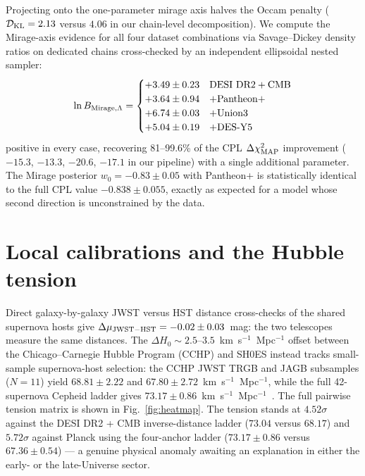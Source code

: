 \documentclass[aps,prd,twocolumn,superscriptaddress,nofootinbib]{revtex4-2}
\begin{document}
Projecting onto the one-parameter mirage axis halves the Occam penalty ($\mathcal{D}_{\rm KL} = 2.13$ versus $4.06$ in our chain-level decomposition). We compute the Mirage-axis evidence for all four dataset combinations via Savage--Dickey density ratios on dedicated chains cross-checked by an independent ellipsoidal nested sampler:
\begin{equation}
\ln B_{\rm Mirage,\Lambda} = \begin{cases}
+3.49 \pm 0.23 & {\rm DESI~DR2 + CMB} \\
+3.64 \pm 0.94 & + {\rm Pantheon+} \\
+6.74 \pm 0.03 & + {\rm Union3} \\
+5.04 \pm 0.19 & + {\rm DES\text{-}Y5}
\end{cases}
\label{eq:mirage}
\end{equation}
positive in every case, recovering 81--99.6\% of the CPL $\Delta\chi^2_{\rm MAP}$ improvement ($-15.3$, $-13.3$, $-20.6$, $-17.1$ in our pipeline) with a single additional parameter. The Mirage posterior $w_0 = -0.83 \pm 0.05$ with Pantheon+ is statistically identical to the full CPL value $-0.838 \pm 0.055$, exactly as expected for a model whose second direction is unconstrained by the data.

\section{Local calibrations and the Hubble tension}
\label{sec:tension}

Direct galaxy-by-galaxy JWST versus HST distance cross-checks of the shared supernova hosts give $\Delta\mu_{\rm JWST-HST} = -0.02 \pm 0.03$~mag: the two telescopes measure the same distances. The $\Delta H_0 \sim 2.5$--$3.5$~km~s$^{-1}$~Mpc$^{-1}$ offset between the Chicago--Carnegie Hubble Program (CCHP) and SH0ES instead tracks small-sample supernova-host selection: the CCHP JWST TRGB and JAGB subsamples ($N = 11$) yield $68.81 \pm 2.22$ and $67.80 \pm 2.72$~km~s$^{-1}$~Mpc$^{-1}$, while the full 42-supernova Cepheid ladder gives $73.17 \pm 0.86$~km~s$^{-1}$~Mpc$^{-1}$~\cite{Riess2024,Freedman2025,Lee2025}. The full pairwise tension matrix is shown in Fig.~\ref{fig:heatmap}. The tension stands at $4.52\sigma$ against the DESI DR2 + CMB inverse-distance ladder ($73.04$ versus $68.17$) and $5.72\sigma$ against Planck using the four-anchor ladder ($73.17 \pm 0.86$ versus $67.36 \pm 0.54$) --- a genuine physical anomaly awaiting an explanation in either the early- or the late-Universe sector.
\end{document}
